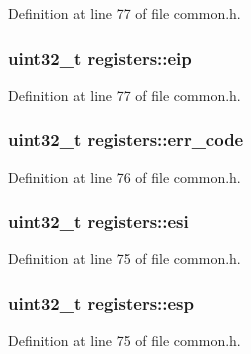 Definition at line 77 of file common.\+h.

\subsubsection[{\texorpdfstring{eip}{eip}}]{\setlength{\rightskip}{0pt plus 5cm}uint32\+\_\+t registers\+::eip}\hypertarget{structregisters_aaeedf83509826a731e436025aeb53576}{}\label{structregisters_aaeedf83509826a731e436025aeb53576}


Definition at line 77 of file common.\+h.

\subsubsection[{\texorpdfstring{err\+\_\+code}{err_code}}]{\setlength{\rightskip}{0pt plus 5cm}uint32\+\_\+t registers\+::err\+\_\+code}\hypertarget{structregisters_a1f90b3d484c66002c9ffcd0e54e97c2c}{}\label{structregisters_a1f90b3d484c66002c9ffcd0e54e97c2c}


Definition at line 76 of file common.\+h.

\subsubsection[{\texorpdfstring{esi}{esi}}]{\setlength{\rightskip}{0pt plus 5cm}uint32\+\_\+t registers\+::esi}\hypertarget{structregisters_a8da011d75d93d36da6c4cf28e1fa3179}{}\label{structregisters_a8da011d75d93d36da6c4cf28e1fa3179}


Definition at line 75 of file common.\+h.

\subsubsection[{\texorpdfstring{esp}{esp}}]{\setlength{\rightskip}{0pt plus 5cm}uint32\+\_\+t registers\+::esp}\hypertarget{structregisters_a9cc3091e4c0f25d142ac74443dc8d384}{}\label{structregisters_a9cc3091e4c0f25d142ac74443dc8d384}


Definition at line 75 of file common.\+h.

